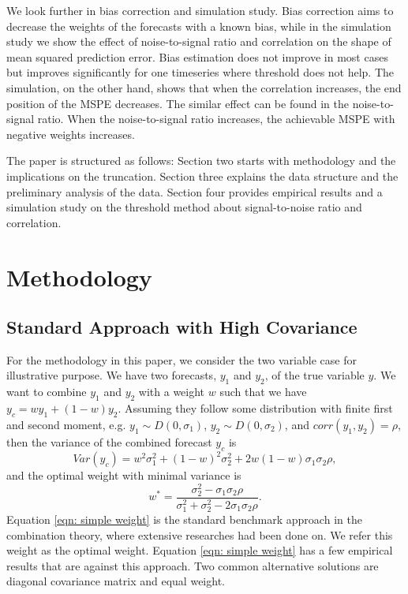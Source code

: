 \documentclass[11pt]{article}
\begin{document}
We look further in bias correction and simulation study. Bias correction aims to decrease the weights of the forecasts with a known bias, while in the simulation study we show the effect of noise-to-signal ratio and correlation on the shape of mean squared prediction error. Bias estimation does not improve in most cases but improves significantly for one timeseries where threshold does not help. The simulation, on the other hand, shows that when the correlation increases, the end position of the MSPE decreases. The similar effect can be found in the noise-to-signal ratio. When the noise-to-signal ratio increases, the achievable MSPE with negative weights increases.

The paper is structured as follows: Section two starts with methodology and the implications on the truncation. Section three explains the data structure and the preliminary analysis of the data. Section four provides empirical results and a simulation study on the threshold method about signal-to-noise ratio and correlation.


\section{Methodology}\label{methodology}

\subsection{Standard Approach with High Covariance}\label{standard-approach}

For the methodology in this paper, we consider the two variable case for illustrative purpose. We have
two forecasts, \(y_1\) and \(y_2\), of the true variable \(y\). We want
to combine \(y_1\) and \(y_2\) with a weight \(w\) such that we have
\(y_c = w y_1 + (1-w) y_2\). Assuming they follow some distribution with finite first and second moment, e.g.
\(y_1 \sim D(0,\sigma_1)\), \(y_2 \sim D(0,\sigma_2)\), and
\(corr(y_1,y_2)=\rho\), then the variance of the combined forecast
\(y_c\) is
\begin{equation}
\label{eqn: var yc}
Var(y_c) = w^2\sigma_1^2+ (1-w)^2\sigma_2^2+2w(1-w)\sigma_1\sigma_2\rho,
\end{equation}
and the optimal weight with minimal variance is
\begin{equation}
\label{eqn: simple weight}
w^*=\frac{\sigma_2^2-\sigma_1\sigma_2\rho}{\sigma_1^2+\sigma_2^2 -2\sigma_1\sigma_2\rho}.
\end{equation}
Equation \ref{eqn: simple weight} is the standard benchmark approach in
the combination theory, where extensive researches had been done on. We refer this weight as the optimal weight. Equation \ref{eqn: simple weight} has a few
empirical results that are against this approach. Two common
alternative solutions are diagonal covariance matrix and equal weight.
\end{document}
